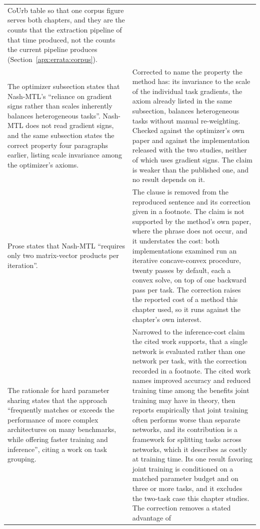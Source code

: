 {\begin{longtable}{@{}p{}p{}@{}}
CoUrb table so that one corpus figure serves both chapters, and they are the counts that the
extraction pipeline of that time produced, not the counts the current pipeline produces
(Section~\ref{apx:errata:corpus}). \\
\addlinespace
The optimizer subsection states that Nash-MTL's ``reliance on gradient signs rather than
scales inherently balances heterogeneous tasks''. Nash-MTL does not read gradient signs,
and the same subsection states the correct property four paragraphs earlier, listing
scale invariance among the optimizer's axioms. &
Corrected to name the property the method has: its invariance to the scale of the
individual task gradients, the axiom already listed in the same subsection, balances
heterogeneous tasks without manual re-weighting. Checked against the optimizer's own
paper and against the implementation released with the two studies, neither of which
uses gradient signs. The claim is weaker than the published one, and no result depends
on it. \\
\addlinespace
Prose states that Nash-MTL ``requires only two matrix-vector products per iteration''. &
The clause is removed from the reproduced sentence and its correction given in a footnote.
The claim is not supported by the method's own paper, where the phrase does not occur, and
it understates the cost: both implementations examined run an iterative concave-convex
procedure, twenty passes by default, each a convex solve, on top of one backward pass per
task. The correction raises the reported cost of a method this chapter used, so it runs
against the chapter's own interest. \\
\addlinespace
The rationale for hard parameter sharing states that the approach ``frequently matches or
exceeds the performance of more complex architectures on many benchmarks, while offering
faster training and inference'', citing a work on task grouping. &
Narrowed to the inference-cost claim the cited work supports, that a single network is
evaluated rather than one network per task, with the correction recorded in a footnote. The
cited work names improved accuracy and reduced training time among the benefits joint
training may have in theory, then reports empirically that joint training often performs
worse than separate networks, and its contribution is a framework for splitting tasks across
networks, which it describes as costly at training time. Its one result favoring joint
training is conditioned on a matched parameter budget and on three or more tasks, and it
excludes the two-task case this chapter studies. The correction removes a stated advantage of

\end{longtable}}
